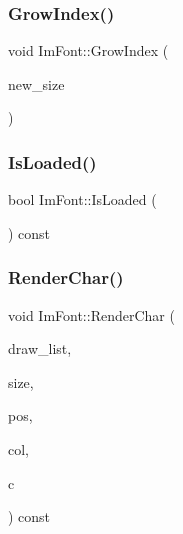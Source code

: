 \hypertarget{struct_im_font_ab7865a365d9653b4636b198d2f222fd6}{}\label{struct_im_font_ab7865a365d9653b4636b198d2f222fd6} 
\subsubsection{\texorpdfstring{Grow\+Index()}{GrowIndex()}}
{\footnotesize\ttfamily void Im\+Font\+::\+Grow\+Index (\begin{DoxyParamCaption}\item[{int}]{new\+\_\+size }\end{DoxyParamCaption})}

\hypertarget{struct_im_font_a97dafa61cc94e84be396d69b0d42b1ce}{}\label{struct_im_font_a97dafa61cc94e84be396d69b0d42b1ce} 
\subsubsection{\texorpdfstring{Is\+Loaded()}{IsLoaded()}}
{\footnotesize\ttfamily bool Im\+Font\+::\+Is\+Loaded (\begin{DoxyParamCaption}{ }\end{DoxyParamCaption}) const}

\hypertarget{struct_im_font_af602fe8f445ae4142436ee3e6baa3ede}{}\label{struct_im_font_af602fe8f445ae4142436ee3e6baa3ede} 
\subsubsection{\texorpdfstring{Render\+Char()}{RenderChar()}}
{\footnotesize\ttfamily void Im\+Font\+::\+Render\+Char (\begin{DoxyParamCaption}\item[{\hyperlink{struct_im_draw_list}{Im\+Draw\+List} $\ast$}]{draw\+\_\+list,  }\item[{float}]{size,  }\item[{\hyperlink{struct_im_vec2}{Im\+Vec2}}]{pos,  }\item[{Im\+U32}]{col,  }\item[{unsigned short}]{c }\end{DoxyParamCaption}) const}

\hypertarget{struct_im_font_a2877acf1cfcd964bc2e7fe600a08849e}{}\label{struct_im_font_a2877acf1cfcd964bc2e7fe600a08849e} 

